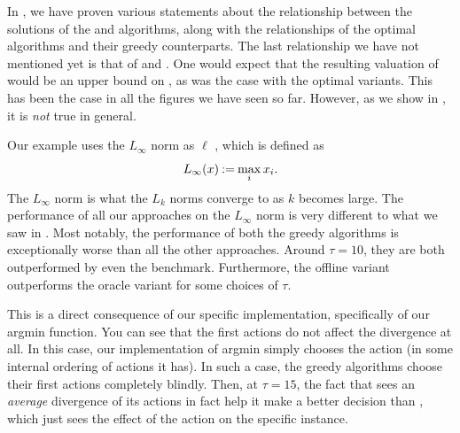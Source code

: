 In , we have proven various statements about the relationship between the solutions of the \algFO{} and \algRO{} algorithms, along with the relationships of the optimal algorithms and their greedy counterparts.
The last relationship we have not mentioned yet is that of \algFG{} and \algRG{}.
One would expect that the resulting valuation of \algFG{} would be an upper bound on \algRG{}, as was the case with the optimal variants.
This has been the case in all the figures we have seen so far. 
However, as we show in , it is \emph{not} true in general.

Our example uses the $ L_\infty $ norm as $ \ell $ , which is defined as \[
  L_\infty\!\left(x\right) \mathbin{:=} \max_i x_i.
\]
The $ L_\infty $ norm is what the $ L_k $ norms converge to as $ k $ becomes large. 
The performance of all our approaches on the $L_\infty$ norm is very different to what we saw in .
Most notably, the performance of both the greedy algorithms is exceptionally worse than all the other approaches.
Around $ \tau = 10 $, they are both outperformed by even the \algRand{} benchmark.
Furthermore, the offline variant outperforms the oracle variant for some choices of $ \tau $.

This is a direct consequence of our specific implementation, specifically of our argmin function.
You can see that the first actions do not affect the divergence at all. 
In this case, our implementation of argmin simply chooses the  action (in some internal ordering of actions it has).
In such a case, the greedy algorithms choose their first actions completely blindly.
Then, at $ \tau=15 $, the fact that \algFG{} sees an \emph{average} divergence of its actions in fact help it make a better decision than \algRG{}, which just sees the effect of the action on the specific instance.

